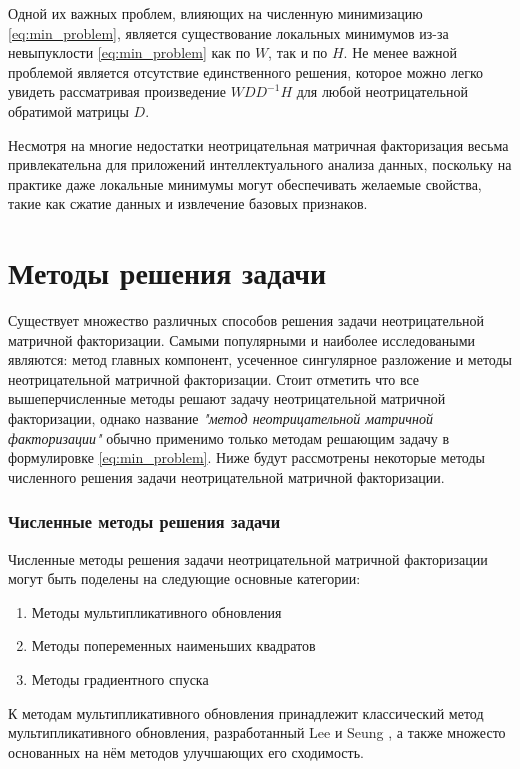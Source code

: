 Одной их важных проблем, влияющих на численную минимизацию \ref{eq:min_problem},
является существование локальных минимумов
из-за невыпуклости \ref{eq:min_problem} как по $W$, так и по $H$.
Не менее важной проблемой является отсутствие единственного решения,
которое можно легко увидеть рассматривая произведение $WDD^{− 1}H$ для любой неотрицательной обратимой матрицы $D$.

Несмотря на многие недостатки неотрицательная матричная факторизация весьма привлекательна для приложений интеллектуального анализа данных,
поскольку на практике даже локальные минимумы могут обеспечивать желаемые свойства, такие как сжатие данных и извлечение базовых признаков.





\newpage





\section{Методы решения задачи}

Существует множество различных способов решения задачи неотрицательной матричной факторизации.
Самыми популярными и наиболее исследоваными являются: метод главных компонент, усеченное сингулярное разложение и методы неотрицательной матричной факторизации.
Стоит отметить что все вышеперчисленные методы решают задачу неотрицательной матричной факторизации,
однако название \textit{"метод неотрицательной матричной факторизации"} обычно применимо только методам решающим задачу в формулировке \ref{eq:min_problem}.
Ниже будут рассмотрены некоторые методы численного решения задачи неотрицательной матричной факторизации.

\subsubsection{Численные методы решения задачи}
Численные методы решения задачи неотрицательной матричной факторизации
могут быть поделены на следующие основные категории:
\begin{enumerate}
	\item Методы мультипликативного обновления
	\item Методы попеременных наименьших квадратов
	\item Методы градиентного спуска
\end{enumerate}

К методам мультипликативного обновления принадлежит классический метод мультипликативного обновления,
разработанный Lee и Seung \cite{lee_seung},
а также множесто основанных на нём методов улучшающих его сходимость.

